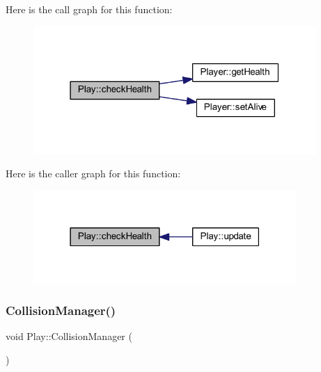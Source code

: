 Here is the call graph for this function\+:
\nopagebreak
\begin{figure}[H]
\begin{center}
\leavevmode
\includegraphics[width=304pt]{class_play_a75c96673011616e5c97731870ddb649e_cgraph}
\end{center}
\end{figure}
Here is the caller graph for this function\+:
\nopagebreak
\begin{figure}[H]
\begin{center}
\leavevmode
\includegraphics[width=283pt]{class_play_a75c96673011616e5c97731870ddb649e_icgraph}
\end{center}
\end{figure}
\mbox{\label{class_play_a3dbdeaf231718f05feac075aa4902175}} 
\subsubsection{\texorpdfstring{Collision\+Manager()}{CollisionManager()}}
{\footnotesize\ttfamily void Play\+::\+Collision\+Manager (\begin{DoxyParamCaption}{ }\end{DoxyParamCaption})}


